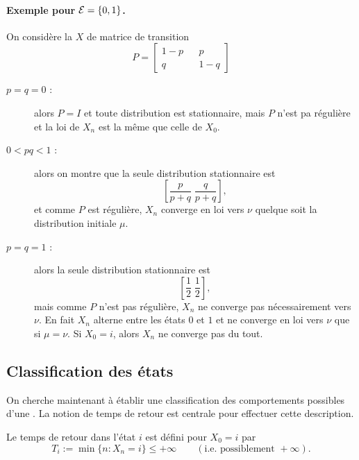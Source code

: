 \paragraph{Exemple pour $\mathcal{E} = \{0, 1\}$.}
On considère la \cM $X$ de matrice de transition 
$$
P = \left[\begin{array}{ccc}
      1 - p & & p \\
      q & & 1 - q 
    \end{array}\right]
$$
\begin{description}
  \item[$p = q = 0$ :] alors $P = I$ et toute distribution est stationnaire, mais $P$ n'est pa régulière et la loi de $X_n$ est la même que celle de $X_0$.
  \item[$0 < pq < 1$ :] alors on montre que la seule distribution stationnaire est 
  $$
  \left[ \frac{p}{p+q} \;  \frac{q}{p+q} \right],
  $$
  et comme $P$ est régulière, $X_n$ converge en loi vers $\nu$ quelque soit la distribution initiale $\mu$.
  \item[$p = q = 1$ :] alors la seule distribution stationnaire est 
  $$
  \left[ \frac12 \;  \frac12 \right],
  $$
  mais comme $P$ n'est pas régulière, $X_n$ ne converge pas nécessairement vers $\nu$. En fait $X_n$ alterne entre les états $0$ et $1$ et ne converge en loi vers $\nu$ que si $\mu = \nu$. Si $X_0 = i$, alors $X_n$ ne converge pas du tout.
\end{description}

\subsection{Classification des états}  


On cherche maintenant à établir une classification des comportements possibles d'une \cM. La notion de temps de retour est centrale pour effectuer cette description.

\begin{definition*}
  Le temps de retour dans l'état $i$ est défini pour $X_0 = i$ par
  $$
  T_i := \min\{n : X_n = i\} \leq + \infty \qquad (\text{i.e. possiblement } + \infty).
  $$
\end{definition*}

